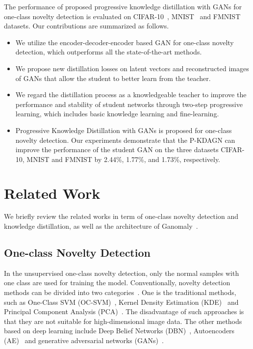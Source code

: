 \documentclass{article}
\begin{document}
	
	The performance of proposed progressive knowledge distillation with GANs for one-class novelty detection is evaluated on CIFAR-10~\cite{CIFAR10:2009}, MNIST~\cite{MNIST:2010} and FMNIST~\cite{FMNIST:2017} datasets. Our contributions are summarized as follows.
	\begin{itemize}
		\item We utilize the encoder-decoder-encoder based GAN for one-class novelty detection, which outperforms all the state-of-the-art methods.
		
		\item We propose new distillation losses on latent vectors and reconstructed images of GANs that allow the student to better learn from the teacher.
		
		\item  We regard the distillation process as a knowledgeable teacher to improve the performance and stability of student networks through two-step progressive learning, which includes basic knowledge learning and fine-learning.
		
		\item Progressive Knowledge Distillation with GANs is proposed for one-class novelty detection. Our experiments demonstrate that the P-KDAGN can improve the performance of the student GAN on the three datasets CIFAR-10, MNIST and FMNIST by 2.44\%, 1.77\%, and 1.73\%, respectively. 
	\end{itemize}
	
	
	
	
\section{Related Work}
	We briefly review the related works in term of one-class novelty detection and knowledge distillation, as well as the architecture of Ganomaly~\cite{ganomaly:2018}.
	
	
	\subsection{One-class Novelty Detection}
	In the unsupervised one-class novelty detection, only the normal samples with one class are used for training the model. Conventionally, novelty detection methods can be divided into two categories~\cite{survey:2009}. One is the traditional methods, such as One-Class SVM (OC-SVM)~\cite{OCSVM:2001}, Kernel Density Estimation (KDE)~\cite{KDE:1962} and Principal Component Analysis (PCA)~\cite{PCA:1987}. The disadvantage of such approaches is that they are not suitable for high-dimensional image data. The other methods based on deep learning include Deep Belief Networks (DBN)~\cite{DBN:2016}, Autoencoders (AE)~\cite{DenoisAE:2008} and generative adversarial networks (GANs)~\cite{AnoGAN:2017,EfficientGAN:2018,OCGAN:2019}.
	
\end{document}
